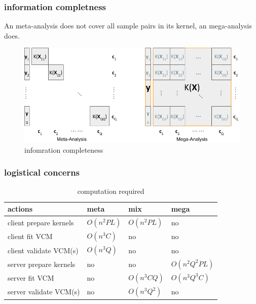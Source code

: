 \documentclass{beamer}
\begin{document}
\begin{frame}\frametitle{information completness}
  An meta-analysis does not cover all sample pairs in its kernel, an
  mega-analysis does.
  \begin{figure}
    \centering
    \includegraphics[width=.9\textwidth]{img/meta-mega}
    \caption{infomration completeness}
    \label{fig:info_comp}
  \end{figure}
\end{frame}
\begin{frame}\frametitle{logistical concerns}
  \begin{table}[h]
    \label{tb:cost}
    \begin{tabular}{|l|l|l|l|}
      \hline
      \textbf{actions}       & \textbf{meta} & \textbf{mix}  & \textbf{mega} \\ \hline
      client prepare kernels & $O(n^2PL)$    & $O(n^2PL)$    & no            \\ \hline
      client fit VCM         & $O(n^3C)$     & no            & no            \\ \hline
      client validate VCM(s) & $O(n^3Q)$     & no            & no            \\ \hline
      server prepare kernels & no            & no            & $O(n^2Q^2PL)$ \\ \hline
      server fit VCM         & no            & $O(n^3CQ)$    & $O(n^3Q^3C)$  \\ \hline
      server validate VCM(s) & no            & $O(n^3Q^2)$   & no            \\ \hline
    \end{tabular}
    \caption{computation required}
  \end{table}
\end{frame}
\end{document}
